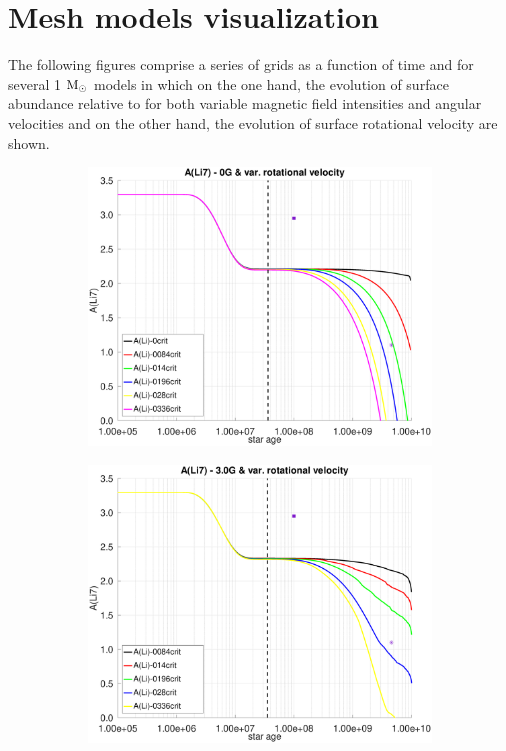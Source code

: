 \documentclass[fleqn,usenatbib]{mnras}
\begin{document}


\appendix

\section{Mesh models visualization}
The following figures comprise a series of grids as a function of time and for several 1 $\mathrm{M}_\odot$ models in which on the one hand, the evolution of surface  abundance relative to  for both variable magnetic field intensities and angular velocities and on the other hand, the evolution of surface rotational velocity are shown.

\begin{figure}
    \centering
    \begin{subfigure}[h]{0.47\textwidth}
    \includegraphics[trim = 25mm 10mm 15mm 10mm, clip,width=\textwidth]{figures/li_var_vel_0_0g.eps}
    \label{fig:subim1}
    \end{subfigure}
    \begin{subfigure}[h]{0.47\textwidth}
    \includegraphics[trim = 25mm 10mm 15mm 10mm, clip,width=\textwidth]{figures/li_var_vel_3_0g.eps}

\end{subfigure}
\end{figure}
\end{document}
